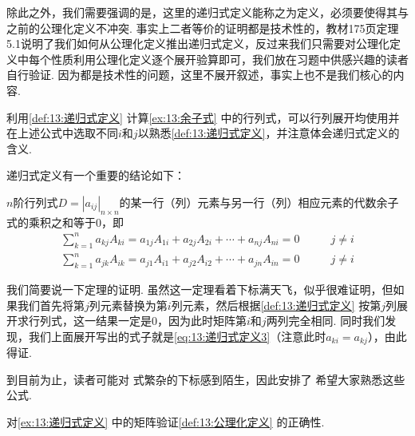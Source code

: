 除此之外，我们需要强调的是，这里的递归式定义能称之为定义，必须要使得其与之前的公理化定义不冲突. 事实上二者等价的证明都是技术性的，教材175页定理5.1说明了我们如何从公理化定义推出递归式定义，反过来我们只需要对公理化定义中每个性质利用公理化定义逐个展开验算即可，我们放在习题中供感兴趣的读者自行验证. 因为都是技术性的问题，这里不展开叙述，事实上也不是我们核心的内容.
\begin{example} \label{ex:13:递归式定义}
    利用\autoref{def:13:递归式定义} 计算\autoref{ex:13:余子式} 中的行列式，可以行列展开均使用并在上述公式中选取不同$i$和$j$以熟悉\autoref*{def:13:递归式定义}，并注意体会递归式定义的含义.
\end{example}

\begin{solution}

\end{solution}

递归式定义有一个重要的结论如下：
\begin{theorem}
    $n$阶行列式$D=|a_{ij}|_{n \times n}$的某一行（列）元素与另一行（列）相应元素的代数余子式的乘积之和等于0，即
    \begin{align}
        \label{eq:13:递归式定义3}
        \sum_{k=1}^{n}a_{kj}A_{ki}=a_{1j}A_{1i}+a_{2j}A_{2i}+\cdots+a_{nj}A_{ni}=0 & \qquad j \neq i \\
        \label{eq:13:递归式定义4}
        \sum_{k=1}^{n}a_{jk}A_{ik}=a_{j1}A_{i1}+a_{j2}A_{i2}+\cdots+a_{jn}A_{in}=0 & \qquad j \neq i
    \end{align}
\end{theorem}

我们简要说一下定理的证明. 虽然这一定理看着下标满天飞，似乎很难证明，但如果我们首先将第$j$列元素替换为第$i$列元素，然后根据\autoref{def:13:递归式定义} 按第$j$列展开求行列式，这一结果一定是0，因为此时矩阵第$i$和$j$两列完全相同. 同时我们发现，我们上面展开写出的式子就是\autoref{eq:13:递归式定义3}（注意此时$a_{ki}=a_{kj}$），由此得证.

到目前为止，读者可能对 式繁杂的下标感到陌生，因此安排了 希望大家熟悉这些公式.
\begin{example} \label{ex:13:递归式定义2}
    对\autoref{ex:13:递归式定义} 中的矩阵验证\autoref{def:13:公理化定义} 的正确性.
\end{example}

\begin{solution}

\end{solution}

